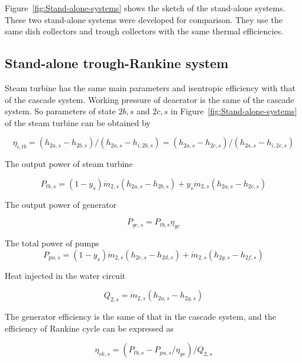 Figure~\ref{fig:Stand-alone-systems} shows the sketch of the stand-alone systems. These two stand-alone systems were developed for comparison. They use the same dish collectors and trough collectors with the same thermal efficiencies.

\subsection{Stand-alone trough-Rankine system}

Steam turbine has the same main parameters and isentropic efficiency with that of the cascade system. Working pressure of deaerator is the same of the cascade system. So parameters of state $2b,s$ and $2c,s$ in Figure~\ref{fig:Stand-alone-systems} of the steam turbine can be obtained by

\begin{equation}
	\eta_{i,tb}= (h_{2a,s}-h_{2b,s})/(h_{2a,s}-h_{i,2b,s}) = (h_{2a,s}-h_{2c,s})/(h_{2a,s}-h_{i,2c,s})
\end{equation}

The output power of steam turbine

\begin{equation}
	P_{tb,s}=\left(1-y_{s}\right)\dot{m}_{2,s}\left(h_{2a,s}-h_{2b,s}\right)+y_{s}\dot{m}_{2,s}\left(h_{2a,s}-h_{2c,s}\right)
\end{equation}

The output power of generator

\begin{equation}
	P_{ge,s}=P_{tb,s}\eta_{ge}
\end{equation}

The total power of pumps
\begin{equation}
	P_{pu,s}=\left(1-y_{s}\right)\dot{m}_{2,s}\left(h_{2e,s}-h_{2d,s}\right)+\dot{m}_{2,s}\left(h_{2g,s}-h_{2f,s}\right)
\end{equation}

Heat injected in the water circuit

\begin{equation}
	Q_{2,s}=\dot{m}_{2,s}\left(h_{2a,s}-h_{2g,s}\right)
\end{equation}

The generator efficiency is the same of that in the cascade system, and the efficiency of Rankine cycle can be expressed as

\begin{equation}
	\eta_{rk,s}=(P_{tb,s}-P_{pu,s}/\eta_{ge})/Q_{2,s}
\end{equation}

